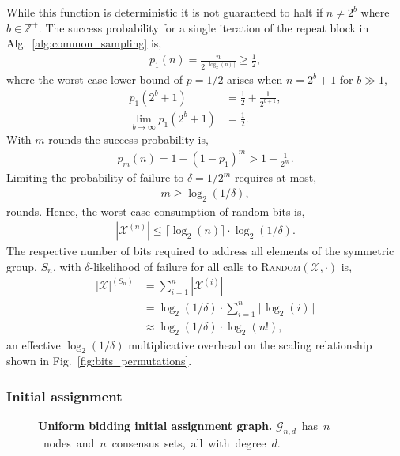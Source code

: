 \documentclass[twocolumn, aps, amsmath, amssymb, nofootinbib, superscriptaddress, longbibliography, floatfix, eqsecnum, rmp]{revtex4-2}
\begin{document}
While this function is deterministic it is not guaranteed to halt if $n\neq 2^b$ where $b\in\mathbb{Z}^+$. The success probability for a single iteration of the repeat block in Alg.~\ref{alg:common_sampling} is,
\begin{align}
	p_1(n) = \frac{n}{2^{\lceil \log_2(n) \rceil}} \geq \frac{1}{2},
\end{align}
where the worst-case lower-bound of $p=1/2$ arises when \mbox{$n=2^b+1$} for \mbox{$b\gg 1$},
\begin{align}
	p_1(2^b+1) &= \frac{1}{2} + \frac{1}{2^{b+1}},\nonumber\\
	\lim_{b\to\infty} p_1(2^b+1) &= \frac{1}{2}.
\end{align}
With $m$ rounds the success probability is,
\begin{align}
	p_m(n) = 1-(1-p_1)^m > 1-\frac{1}{2^m}.
\end{align}
Limiting the probability of failure to $\delta=1/2^m$ requires at most,
\begin{align}
	m \geq \log_2(1/\delta),
\end{align}
rounds. Hence, the worst-case consumption of random bits is,
\begin{align}
	|\mathcal{X}^{(n)}| \leq \lceil \log_2(n) \rceil \cdot \log_2(1/\delta).
\end{align}
The respective number of bits required to address all elements of the symmetric group, $S_n$, with $\delta$-likelihood of failure for all calls to \textsc{Random}$(\mathcal{X},\cdot)$ is,
\begin{align}
	|\mathcal{X}|^{(S_n)} &= \sum_{i=1}^n |\mathcal{X}^{(i)}| \nonumber\\
	&= \log_2(1/\delta) \cdot \sum_{i=1}^n \lceil\log_2(i)\rceil \nonumber\\
	&\approx \log_2(1/\delta) \cdot \log_2(n!),
\end{align}
an effective $\log_2(1/\delta)$ multiplicative overhead on the scaling relationship shown in Fig.~\ref{fig:bits_permutations}.

\subsubsection{Initial assignment} \label{sec:initial_graph_assignment}

\begin{figure}[!htb]
	\centering
	
	\caption{\textbf{Uniform bidding initial assignment graph.} \mbox{$\mathcal{G}_{n,d}$ has $n$ nodes and $n$ consensus sets, all with degree $d$.}}\label{fig:butterfly_graph}
\end{figure}
\end{document}
